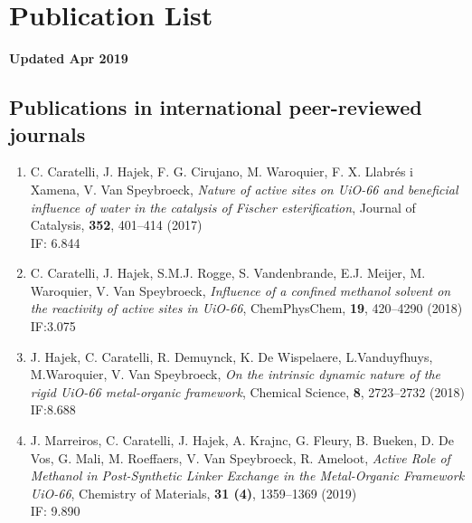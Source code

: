 \renewcommand\evenpagerightmark{{\scshape\small Appendix A}}
\renewcommand\oddpageleftmark{{\scshape\small Publication List}}



\chapter[Publication List]{Publication List}
\label{app1}

\textbf{Updated Apr 2019}
\npar
\section*{Publications in international peer-reviewed journals}

\begin{enumerate}
\item
C. Caratelli, J. Hajek, F. G. Cirujano, M. Waroquier, F. X.
Llabr\'es i Xamena, V. Van Speybroeck, \textit{Nature of active sites on UiO-66
and beneficial influence of water in the catalysis of Fischer esterification},
Journal of Catalysis, \textbf{352}, 401--414 (2017) \\
IF: 6.844

\item
C. Caratelli, J. Hajek, S.M.J. Rogge, S. Vandenbrande, E.J. Meijer, M.
Waroquier, V. Van Speybroeck, \textit{Influence of a confined methanol solvent on the reactivity of active sites in UiO-66}, ChemPhysChem, \textbf{19}, 420--4290 (2018)\\ 
IF:3.075 

\item
J. Hajek, C. Caratelli, R. Demuynck, K. De Wispelaere, L.Vanduyfhuys, M.Waroquier, V. Van Speybroeck, \textit{On the intrinsic dynamic nature of the rigid UiO-66 metal-organic framework},  Chemical Science, \textbf{8}, 2723--2732 (2018)\\ IF:8.688

\item
J. Marreiros, C. Caratelli, J. Hajek, A. Krajnc, G. Fleury, B. Bueken, D. De Vos, G. Mali, M. Roeffaers, V. Van Speybroeck, R. Ameloot, \textit{Active Role of Methanol in Post-Synthetic Linker Exchange in the Metal-Organic Framework UiO-66}, Chemistry of Materials, \textbf{31 (4)}, 1359--1369 (2019)\\ 
IF: 9.890
\end{enumerate}

